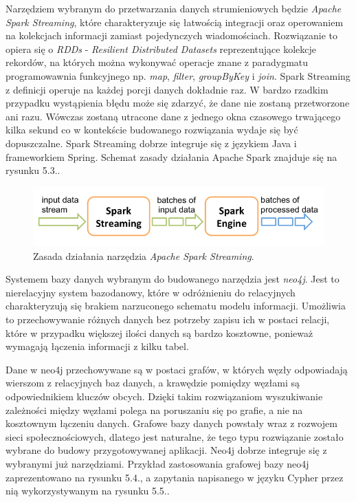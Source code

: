 Narzędziem wybranym do przetwarzania danych strumieniowych będzie \textit{Apache Spark Streaming}, które charakteryzuje się łatwością integracji oraz operowaniem na kolekcjach informacji zamiast pojedynczych wiadomościach. Rozwiązanie to opiera się o \textit{RDDs} - \textit{Resilient Distributed Datasets} reprezentujące kolekcje rekordów, na których można wykonywać operacje znane z paradygmatu programowawnia funkcyjnego np. \textit{map}, \textit{filter}, \textit{groupByKey} i \textit{join}. Spark Streaming z definicji operuje na każdej porcji danych dokładnie raz. W bardzo rzadkim przypadku wystąpienia błędu może się zdarzyć, że dane nie zostaną przetworzone ani razu. Wówczas zostaną utracone dane z jednego okna czasowego trwającego kilka sekund co w kontekście budowanego rozwiązania wydaje się być dopuszczalne. Spark Streaming dobrze integruje się z językiem Java i frameworkiem Spring. Schemat zasady działania Apache Spark znajduje się na rysunku 5.3..

\begin{figure}[h] %
	\centering
	\includegraphics[width=1.0\linewidth]{img/tools_apache_spark_streaming_1}
	\caption{Zasada działania narzędzia \textit{Apache Spark Streaming}.}
\end{figure}

Systemem bazy danych wybranym do budowanego narzędzia jest \textit{neo4j}. Jest to nierelacyjny system bazodanowy, które w odróżnieniu do relacyjnych charakteryzują się brakiem narzuconego schematu modelu informacji. Umożliwia to przechowywanie różnych danych bez potrzeby zapisu ich w postaci relacji, które w przypadku większej ilości danych są bardzo kosztowne, ponieważ wymagają łączenia informacji z kilku tabel. 

Dane w neo4j przechowywane są w postaci grafów, w których węzły odpowiadają wierszom z relacyjnych baz danych, a krawędzie pomiędzy węzłami są odpowiednikiem kluczów obcych. Dzięki takim rozwiązaniom wyszukiwanie zależności między węzłami polega na poruszaniu się po grafie, a nie na kosztownym łączeniu danych. Grafowe bazy danych powstały wraz z rozwojem sieci społecznościowych, dlatego jest naturalne, że tego typu rozwiązanie zostało wybrane do budowy przygotowywanej aplikacji. Neo4j dobrze integruje się z wybranymi już narzędziami. Przykład zastosowania grafowej bazy neo4j zaprezentowano na rysunku 5.4., a zapytania napisanego w języku Cypher przez nią wykorzystywanym na rysunku 5.5..

